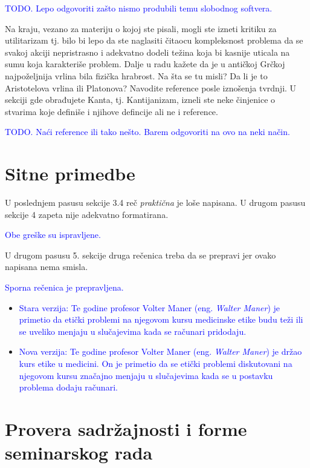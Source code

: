 \documentclass[a4paper]{report}
\newcommand{\odgovor}[1]{\textcolor{blue}{#1}}
\begin{document}
\odgovor{TODO. Lepo odgovoriti zašto nismo produbili temu slobodnog softvera.}

Na kraju, vezano za materiju o kojoj ste pisali, mogli ste izneti kritiku za utilitarizam tj. 
bilo bi lepo da ste naglasiti čitaocu kompleksnost problema da se svakoj akciji 
nepristrasno i adekvatno dodeli težina koja bi kasnije uticala na sumu koja karakteriše problem.
Dalje u radu kažete da je u antičkoj Grčkoj najpoželjnija vrlina bila fizička hrabrost. Na šta se tu misli? Da li
je to Aristotelova vrlina ili Platonova? Navodite reference posle iznošenja tvrdnji. U sekciji gde obrađujete Kanta, tj. Kantijanizam, izneli ste neke činjenice o stvarima koje definiše i njihove defincije ali ne i reference.

\odgovor{TODO. Naći reference ili tako nešto. Barem odgovoriti na ovo na neki način.}

\section{Sitne primedbe}
U poslednjem pasusu sekcije 3.4 reč \textit{praktična} je loše napisana.
U drugom pasusu sekcije 4 zapeta nije adekvatno formatirana.

\odgovor{Obe greške su ispravljene.}

U drugom pasusu 5. sekcije druga rečenica treba da se prepravi jer ovako napisana nema smisla.

\odgovor{Sporna rečenica je prepravljena.}
\begin{itemize}
\item \odgovor{Stara verzija:
Te godine profesor Volter Maner (eng. \textit{Walter Maner}) je primetio da etički problemi na njegovom kursu medicinske etike budu teži ili se uveliko menjaju u slučajevima kada se računari pridodaju.}
\item \odgovor{Nova verzija:
Te godine profesor Volter Maner (eng. \textit{Walter Maner}) je držao kurs etike u medicini. On je primetio da se etički problemi diskutovani na njegovom kursu značajno menjaju u slučajevima kada se u postavku problema dodaju računari.}

\end{itemize}

\section{Provera sadržajnosti i forme seminarskog rada}
\end{document}
